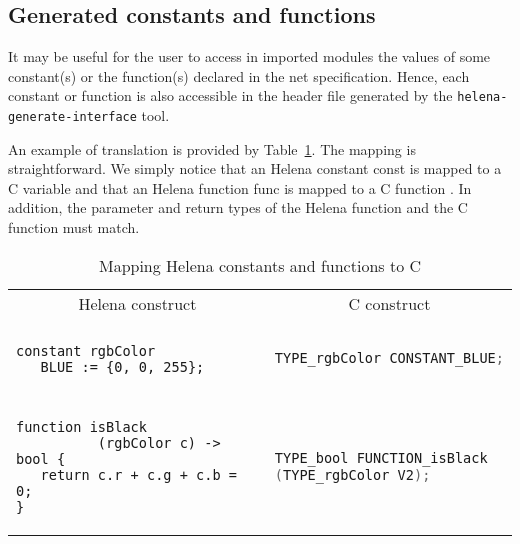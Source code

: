 \subsection{Generated constants and functions}
It may be useful for the user to access in imported modules the values
of some constant(s) or the function(s) declared in the net
specification.  Hence, each constant or function is also accessible in
the header file generated by the \verb+helena-generate-interface+
tool.

An example of translation is provided by
Table~\ref{tbl:const-interface}.  The mapping is straightforward.  We
simply notice that an Helena constant const is mapped to a C variable
 and that an Helena function func is mapped to a C
function .  In addition, the parameter and return
types of the Helena function and the C function must match.
\begin{table}
  \caption{Mapping Helena constants and functions to C}
  \label{tbl:const-interface}
\begin{center}
  \begin{tabular}{|l|l|}
\hline
\multicolumn{1}{|c}{Helena construct} &
\multicolumn{1}{|c|}{C construct}\\
\hhline{==}
\multicolumn{2}{|c|}{Constants}\\
\hline
\begin{lstlisting}
constant rgbColor
   BLUE := {0, 0, 255};
\end{lstlisting} &
\begin{lstlisting}[language=C]
TYPE_rgbColor CONSTANT_BLUE;
\end{lstlisting}\\
\hhline{==}
\multicolumn{2}{|c|}{Functions}\\
\hline
\begin{lstlisting}
function isBlack
          (rgbColor c) -> bool {
   return c.r + c.g + c.b = 0;
}
\end{lstlisting} &
\begin{lstlisting}[language=C]
TYPE_bool FUNCTION_isBlack
(TYPE_rgbColor V2);
\end{lstlisting}\\
\hline
  \end{tabular}
  \end{center}
\end{table}

